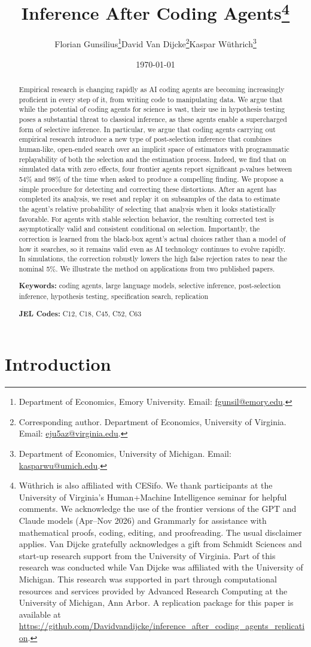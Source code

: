 \documentclass[10pt]{article}
\title{\textbf{Inference After Coding Agents}\thanks{W\"uthrich is also affiliated with CESifo. We thank participants at the University of Virginia's Human+Machine Intelligence seminar for helpful comments. We acknowledge the use of the frontier versions of the GPT and Claude models (Apr--Nov 2026) and Grammarly for assistance with mathematical proofs, coding, editing, and proofreading. The usual disclaimer applies. Van Dijcke gratefully acknowledges a gift from Schmidt Sciences and start-up research support from the University of Virginia. Part of this research was conducted while Van Dijcke was affiliated with the University of Michigan. This research was supported in part through computational resources and services provided by Advanced Research Computing at the University of Michigan, Ann Arbor. A replication package for this paper is available at \url{https://github.com/Davidvandijcke/inference_after_coding_agents_replication}.}}
\author{Florian Gunsilius\thanks{Department of Economics, Emory University. Email: \url{fgunsil@emory.edu}.}\quad \quad David Van Dijcke\thanks{Corresponding author. Department of Economics, University of Virginia. Email: \url{eju5az@virginia.edu}.}\quad \quad Kaspar W\"uthrich\thanks{Department of Economics, University of Michigan. Email: \url{kasparwu@umich.edu}.}}
\date{\today}
\begin{document}
\maketitle

\begin{abstract}

Empirical research is changing rapidly as AI coding agents are becoming increasingly proficient in every step of it, from writing code to manipulating data. We argue that while the potential of coding agents for science is vast, their use in hypothesis testing poses a substantial threat to classical inference, as these agents enable a supercharged form of selective inference. In particular, we argue that coding agents carrying out empirical research introduce a new type of post-selection inference that combines human-like, open-ended search over an implicit space of estimators with programmatic replayability of both the selection and the estimation process. Indeed, we find that on simulated data with zero effects, four frontier agents report significant $p$-values between 54\% and 98\% of the time when asked to produce a compelling finding. We propose a simple procedure for detecting and correcting these distortions. After an agent has completed its analysis, we reset and replay it on subsamples of the data to estimate the agent's relative probability of selecting that analysis when it looks statistically favorable. For agents with stable selection behavior, the resulting corrected test is asymptotically valid and consistent conditional on selection. Importantly, the correction is learned from the black-box agent's actual choices rather than a model of how it searches, so it remains valid even as AI technology continues to evolve rapidly. In simulations, the correction robustly lowers the high false rejection rates to near the nominal 5\%. We illustrate the method on applications from two published papers.

\medskip
\noindent \textbf{Keywords:} coding agents, large language models, selective inference, post-selection inference, hypothesis testing, specification search, replication

\medskip
\noindent \textbf{JEL Codes:} C12, C18, C45, C52, C63
\end{abstract}

\newpage

\section{Introduction}
\end{document}
